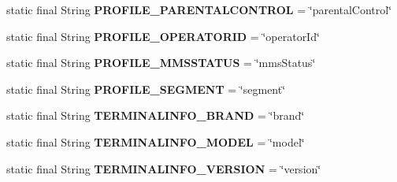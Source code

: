 \begin{DoxyCompactItemize}
\item 
\hypertarget{classcom_1_1bluevia_1_1directory_1_1data_1_1FilterConstants_ae9a26022232fc83cfc4118031e7bd45b}{
static final String {\bfseries PROFILE\_\-PARENTALCONTROL} = \char`\"{}parentalControl\char`\"{}}
\label{classcom_1_1bluevia_1_1directory_1_1data_1_1FilterConstants_ae9a26022232fc83cfc4118031e7bd45b}

\item 
\hypertarget{classcom_1_1bluevia_1_1directory_1_1data_1_1FilterConstants_a677d9843bd21a3cae92b9a6528aa616d}{
static final String {\bfseries PROFILE\_\-OPERATORID} = \char`\"{}operatorId\char`\"{}}
\label{classcom_1_1bluevia_1_1directory_1_1data_1_1FilterConstants_a677d9843bd21a3cae92b9a6528aa616d}

\item 
\hypertarget{classcom_1_1bluevia_1_1directory_1_1data_1_1FilterConstants_a834e0b14dab775cc8eae001850a40d88}{
static final String {\bfseries PROFILE\_\-MMSSTATUS} = \char`\"{}mmsStatus\char`\"{}}
\label{classcom_1_1bluevia_1_1directory_1_1data_1_1FilterConstants_a834e0b14dab775cc8eae001850a40d88}

\item 
\hypertarget{classcom_1_1bluevia_1_1directory_1_1data_1_1FilterConstants_a90d6141e2e1592696834eae685ab78ac}{
static final String {\bfseries PROFILE\_\-SEGMENT} = \char`\"{}segment\char`\"{}}
\label{classcom_1_1bluevia_1_1directory_1_1data_1_1FilterConstants_a90d6141e2e1592696834eae685ab78ac}

\item 
\hypertarget{classcom_1_1bluevia_1_1directory_1_1data_1_1FilterConstants_a0db920873fd20732a2f98c9a9a57303d}{
static final String {\bfseries TERMINALINFO\_\-BRAND} = \char`\"{}brand\char`\"{}}
\label{classcom_1_1bluevia_1_1directory_1_1data_1_1FilterConstants_a0db920873fd20732a2f98c9a9a57303d}

\item 
\hypertarget{classcom_1_1bluevia_1_1directory_1_1data_1_1FilterConstants_aa1e64441f0a585a972f363803115af61}{
static final String {\bfseries TERMINALINFO\_\-MODEL} = \char`\"{}model\char`\"{}}
\label{classcom_1_1bluevia_1_1directory_1_1data_1_1FilterConstants_aa1e64441f0a585a972f363803115af61}

\item 
\hypertarget{classcom_1_1bluevia_1_1directory_1_1data_1_1FilterConstants_aa70bfda1aaa20bdbf735d5d8b3b0f9e1}{
static final String {\bfseries TERMINALINFO\_\-VERSION} = \char`\"{}version\char`\"{}}
\label{classcom_1_1bluevia_1_1directory_1_1data_1_1FilterConstants_aa70bfda1aaa20bdbf735d5d8b3b0f9e1}


\end{DoxyCompactItemize}
